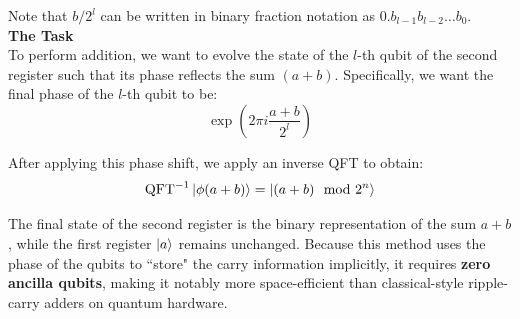 Note that $b/2^l$ can be written in binary fraction notation as $0.b_{l-1}b_{l-2}\ldots b_0$.\\

\textbf{The Task}\\
To perform addition, we want to evolve the state of the $l$-th qubit of the second register such that its phase reflects the sum $(a+b)$. Specifically, we want the final phase of the $l$-th qubit to be:
\begin{equation}
    \exp\left(2\pi i \frac{a+b}{2^l}\right)
\end{equation}
 
After applying this phase shift, we apply an inverse QFT to obtain:
\begin{equation}
    \mathrm{QFT}^{-1}\ket{\phi(a+b)} = \ket{(a+b) \mod 2^n}
\end{equation}

The final state of the second register is the binary representation of the sum $a+b$, while the first register $\ket{a}$ remains unchanged. Because this method uses the phase of the qubits to ``store" the carry information implicitly, it requires \textbf{zero ancilla qubits}, making it notably more space-efficient than classical-style ripple-carry adders on quantum hardware. \\

